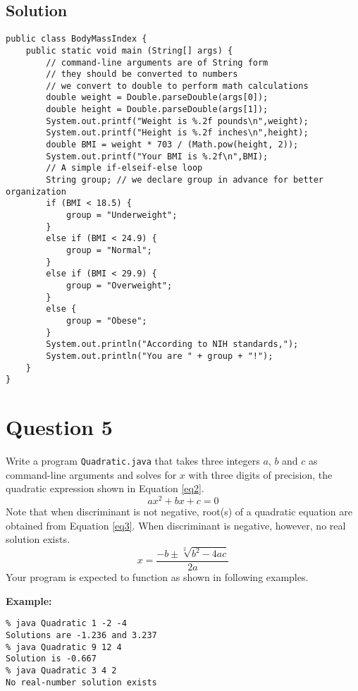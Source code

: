\subsection*{Solution}
\lstset{language=Java,tabsize=2}
\begin{lstlisting}
public class BodyMassIndex {
	public static void main (String[] args) {
		// command-line arguments are of String form
		// they should be converted to numbers
		// we convert to double to perform math calculations
		double weight = Double.parseDouble(args[0]);
		double height = Double.parseDouble(args[1]);
		System.out.printf("Weight is %.2f pounds\n",weight);
		System.out.printf("Height is %.2f inches\n",height);
		double BMI = weight * 703 / (Math.pow(height, 2));
		System.out.printf("Your BMI is %.2f\n",BMI);
		// A simple if-elseif-else loop
		String group; // we declare group in advance for better organization
		if (BMI < 18.5) {
			group = "Underweight";
		}
		else if (BMI < 24.9) {
			group = "Normal";
		}
		else if (BMI < 29.9) {
			group = "Overweight";
		}
		else {
			group = "Obese";
		}
		System.out.println("According to NIH standards,");
		System.out.println("You are " + group + "!");
	}
}
\end{lstlisting}

\section*{Question 5}
Write a program \texttt{Quadratic.java} that takes three integers $a$, $b$ and $c$ as command-line arguments and solves for $x$ with three digits of precision, the quadratic expression shown in Equation \ref{eq2}.
\begin{equation}
ax^2+bx+c=0
\label{eq2}
\end{equation}
Note that when discriminant is not negative, root(s) of a quadratic equation are obtained from Equation \ref{eq3}. When discriminant is negative, however, no real solution exists.
\begin{equation}
x = \frac{-b \pm \sqrt[2]{b^2-4ac}}{2a}
\label{eq3}
\end{equation}
Your program is expected to function as shown in following examples.

\textbf{Example:}
\begin{verbatim}
% java Quadratic 1 -2 -4
Solutions are -1.236 and 3.237
% java Quadratic 9 12 4
Solution is -0.667
% java Quadratic 3 4 2
No real-number solution exists
\end{verbatim}

